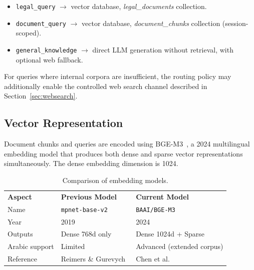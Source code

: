 \documentclass[12pt, a4paper]{article}
\begin{document}
\begin{itemize}[leftmargin=1.8em, itemsep=0.2em]
  \item \texttt{legal\_query} $\rightarrow$ vector database,
        \textit{legal\_documents} collection.
  \item \texttt{document\_query} $\rightarrow$ vector database,
        \textit{document\_chunks} collection (session-scoped).
  \item \texttt{general\_knowledge} $\rightarrow$ direct LLM generation
        without retrieval, with optional web fallback.
\end{itemize}

For queries where internal corpora are insufficient, the routing policy may
additionally enable the controlled web search channel described in
Section~\ref{sec:websearch}.

\subsection{Vector Representation}

Document chunks and queries are encoded using BGE-M3~\cite{chen2024bgem3},
a 2024 multilingual embedding model that produces both dense and sparse vector
representations simultaneously. The dense embedding dimension is 1024.

\begin{table}[H]
  \centering
  \caption{Comparison of embedding models.}
  \label{tab:models}
  \begin{tabularx}{\linewidth}{L{3cm} L{4.5cm} Y}
    \color{white}\textbf{Aspect} &
    \color{white}\textbf{Previous Model} &
    \color{white}\textbf{Current Model} \\
    Name         & \texttt{mpnet-base-v2}            & \texttt{BAAI/BGE-M3} \\
    Year         & 2019                              & 2024 \\
    Outputs      & Dense 768d only                   & Dense 1024d + Sparse \\
    Arabic support & Limited                         & Advanced (extended corpus) \\
    Reference    & Reimers \& Gurevych~\cite{reimers2019sbert} &
                   Chen et al.~\cite{chen2024bgem3} \\
  \end{tabularx}
\end{table}
\end{document}
